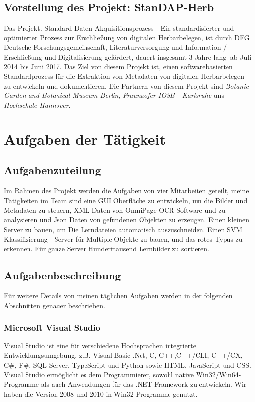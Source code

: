 \documentclass[10pt,a4paper]{report}
\begin{document}
\section{Vorstellung des Projekt: StanDAP-Herb}

Das Projekt, Standard Daten Akquisitionsprozess - Ein standardisierter und optimierter Prozess zur Erschließung von digitalen Herbarbelegen, ist durch DFG Deutsche Forschungsgemeinschaft, Literaturversorgung und Information / Erschließung und Digitalisierung gefördert, dauert insgesamt 3 Jahre lang, ab Juli 2014 bis Juni 2017. Das Ziel von diesem Projekt ist, einen softwarebasierten Standardprozess für die Extraktion von Metadaten von digitalen Herbarbelegen zu entwickeln und dokumentieren. Die Partnern von diesem Projekt sind \textit{Botanic Garden and Botanical Museum Berlin}, \textit{Fraunhofer IOSB - Karlsruhe} uns \textit{Hochschule Hannover}.

\chapter{Aufgaben der Tätigkeit}
\section{Aufgabenzuteilung}

Im Rahmen des Projekt werden die Aufgaben von vier Mitarbeiten geteilt, meine Tätigkeiten im Team sind eine GUI Oberfläche zu entwickeln, um die Bilder und Metadaten zu steuern, XML Daten von OmniPage OCR Software und zu analysieren und Json Daten von gefundenen Objekten zu erzeugen. Einen kleinen Server zu bauen, um Die Lerndateien automatisch auszuschneiden. Einen SVM Klassifizierung - Server für Multiple Objekte zu bauen, und das rotes Typus zu erkennen. Für ganze Server Hunderttausend Lernbilder zu sortieren.

\section{Aufgabenbeschreibung}

Für weitere Details von meinen täglichen Aufgaben werden in der folgenden Abschnitten genauer beschrieben. 

\subsection{Microsoft Visual Studio}
Visual Studio ist eine für verschiedene Hochsprachen integrierte Entwicklungsumgebung, z.B. Visual Basic .Net, C, C++,C++/CLI, C++/CX, C\#, F\#, SQL Server, TypeScript und Python sowie HTML, JavaScript und CSS. Visual Studio ermöglicht es dem Programmierer, sowohl native Win32/Win64-Programme als auch Anwendungen für das .NET Framework zu entwickeln\cite{3}. Wir haben die Version 2008 und 2010 in Win32-Programme genutzt.
\end{document}
